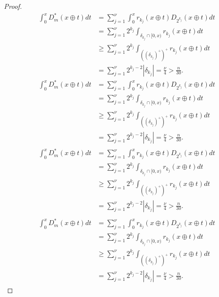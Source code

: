 \documentclass{amsart}
\numberwithin{equation}{section}
\begin{document}
\begin{proof}
{\begin{multline*}
\int_0^x D_m^*(x\oplus t)dt&=\sum_{j=1}^\nu \int_0^x r_{k_j}(x\oplus t)D_{2^{k_j}}(x\oplus t)dt\\
&=\sum_{j=1}^\nu 2^{k_j}\int_{\delta_{k_j}\cap [0,x)} r_{k_j}(x\oplus t)dt\\
&\ge \sum_{j=1}^\nu 2^{k_j}\int_{\left(\left(\delta_{k_j}\right)^+\right)^+} r_{k_j}(x\oplus t)dt\\
&=\sum_{j=1}^\nu 2^{k_j-2}|\delta_{k_j}|=\frac{\nu}{4}>\frac{n}{30}.
\end{multline*}\fi  
{}\begin{multline}
\int_0^x D_m^*(x\oplus t)dt&=\sum_{j=1}^\nu \int_0^x r_{k_j}(x\oplus t)D_{2^{k_j}}(x\oplus t)dt\\
&=\sum_{j=1}^\nu 2^{k_j}\int_{\delta_{k_j}\cap [0,x)} r_{k_j}(x\oplus t)dt\\
&\ge \sum_{j=1}^\nu 2^{k_j}\int_{\left(\left(\delta_{k_j}\right)^+\right)^+} r_{k_j}(x\oplus t)dt\\
&=\sum_{j=1}^\nu 2^{k_j-2}|\delta_{k_j}|=\frac{\nu}{4}>\frac{n}{30}.
\end{multline}\fi  
{}\begin{multline*}\begin{split}
\int_0^x D_m^*(x\oplus t)dt&=\sum_{j=1}^\nu \int_0^x r_{k_j}(x\oplus t)D_{2^{k_j}}(x\oplus t)dt\\
&=\sum_{j=1}^\nu 2^{k_j}\int_{\delta_{k_j}\cap [0,x)} r_{k_j}(x\oplus t)dt\\
&\ge \sum_{j=1}^\nu 2^{k_j}\int_{\left(\left(\delta_{k_j}\right)^+\right)^+} r_{k_j}(x\oplus t)dt\\
&=\sum_{j=1}^\nu 2^{k_j-2}|\delta_{k_j}|=\frac{\nu}{4}>\frac{n}{30}.
\end{split}\end{multline*}\fi
{}\begin{multline}\begin{split}
\int_0^x D_m^*(x\oplus t)dt&=\sum_{j=1}^\nu \int_0^x r_{k_j}(x\oplus t)D_{2^{k_j}}(x\oplus t)dt\\
&=\sum_{j=1}^\nu 2^{k_j}\int_{\delta_{k_j}\cap [0,x)} r_{k_j}(x\oplus t)dt\\
&\ge \sum_{j=1}^\nu 2^{k_j}\int_{\left(\left(\delta_{k_j}\right)^+\right)^+} r_{k_j}(x\oplus t)dt\\
&=\sum_{j=1}^\nu 2^{k_j-2}|\delta_{k_j}|=\frac{\nu}{4}>\frac{n}{30}.
\end{split}\end{multline}\fi
}
\end{proof}
\end{document}
